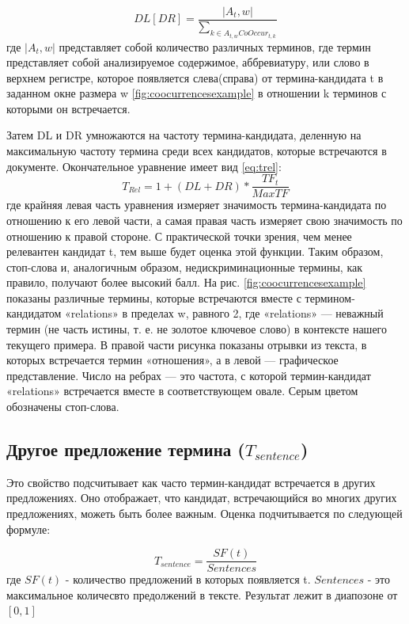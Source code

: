 \begin{equation}
	DL[DR] = \frac{|A_t, w|}{\sum_{k \in A_{t, w}CoOccur_{t, k}}} 
\end{equation}
где $|A_t, w|$ представляет собой количество различных терминов, где термин представляет собой анализируемое содержимое, аббревиатуру, или слово в верхнем регистре, которое появляется слева(справа) от термина-кандидата t в заданном окне размера w \eqref{fig:coocurrencesexample} в отношении k терминов с которыми он встречается.

Затем DL и DR умножаются на частоту термина-кандидата, деленную на максимальную частоту термина среди всех кандидатов, которые встречаются в документе.
Окончательное уравнение имеет вид \eqref{eq:trel}:
\begin{equation}
	\label{eq:trel}
	T_{Rel} = 1 + (DL + DR) * \frac{TF_t}{MaxTF}
\end{equation}
где крайняя левая часть уравнения измеряет значимость термина-кандидата по отношению к его левой части, а
самая правая часть измеряет свою значимость по отношению к правой стороне. С практической точки зрения, чем менее релевантен кандидат t, тем выше будет оценка этой функции.
Таким образом, стоп-слова и, аналогичным образом, недискриминационные термины, как правило, получают более высокий балл. На рис. \eqref{fig:coocurrencesexample} показаны различные термины, которые встречаются вместе с термином-кандидатом «relations» в пределах w, равного 2, где «relations» — неважный термин (не часть истины, т. е. не золотое ключевое слово) в контексте нашего текущего примера.
В правой части рисунка показаны отрывки из текста, в которых встречается термин «отношения», а в левой — графическое представление. 
Число на ребрах — это частота, с которой термин-кандидат «relations» встречается вместе в соответствующем овале. 
Серым цветом обозначены стоп-слова.

\subsection{Другое предложение термина ($T_{sentence}$)}

Это свойство подсчитывает как часто термин-кандидат встречается в других предложениях.
Оно отображает, что кандидат, встречающийся во многих других предложениях, можеть быть более важным.
Оценка подчитывается по следующей формуле:

\begin{equation}
	T_{sentence} = \frac{SF(t)}{Sentences}
\end{equation}
где $SF(t)$ - количество предложений в которых появляется t.
$Sentences$ - это максимальное количесвто предолжений в тексте.
Результат лежит в диапозоне от $[0, 1]$


